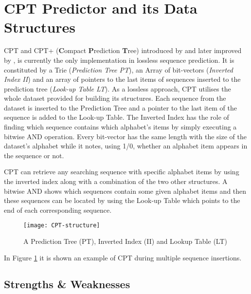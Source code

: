 \section{CPT Predictor and its Data Structures}\label{CPT}
CPT and CPT+ (\textbf{C}ompact \textbf{P}rediction \textbf{T}ree) introduced by \citeauthor{gueniche_fournier-viger_tseng_2013} \citeyear{gueniche_fournier-viger_tseng_2013} and later improved by \citeauthor{gueniche_fournier-viger_raman_tseng_2015} \citeyear{gueniche_fournier-viger_raman_tseng_2015}, is currently the only implementation in lossless sequence prediction. It is constituted by a Trie (\emph{Prediction Tree PT}), an Array of bit-vectors (\emph{Inverted Index II}) and an array of pointers to the last items of sequences inserted to the prediction tree (\emph{Look-up Table LT}). As a lossless approach, CPT utilises the whole dataset provided for building its structures. Each sequence from the dataset is inserted to the Prediction Tree and a pointer to the last item of the sequence is added to the Look-up Table. The Inverted Index has the role of finding which sequence contains which alphabet's items by simply executing a bitwise AND operation. Every bit-vector has the same length with the size of the dataset's alphabet while it notes, using 1/0, whether an alphabet item appears in the sequence or not.
\par CPT can retrieve any searching sequence with specific alphabet items by using the inverted index along with a combination of the two other structures. A bitwise AND shows which sequences contain some given alphabet items and then these sequences can be located by using the Look-up Table which points to the end of each corresponding sequence.

\begin{figure}[h]
    \centering
    \texttt{[image: CPT-structure]}
    \caption{A Prediction Tree (PT), Inverted Index (II) and Lookup Table (LT)}
    \label{fig:CPT-structure}
\end{figure}

In Figure \ref{fig:CPT-structure} it is shown an example of CPT during multiple sequence insertions.

\subsection{Strengths \& Weaknesses}

